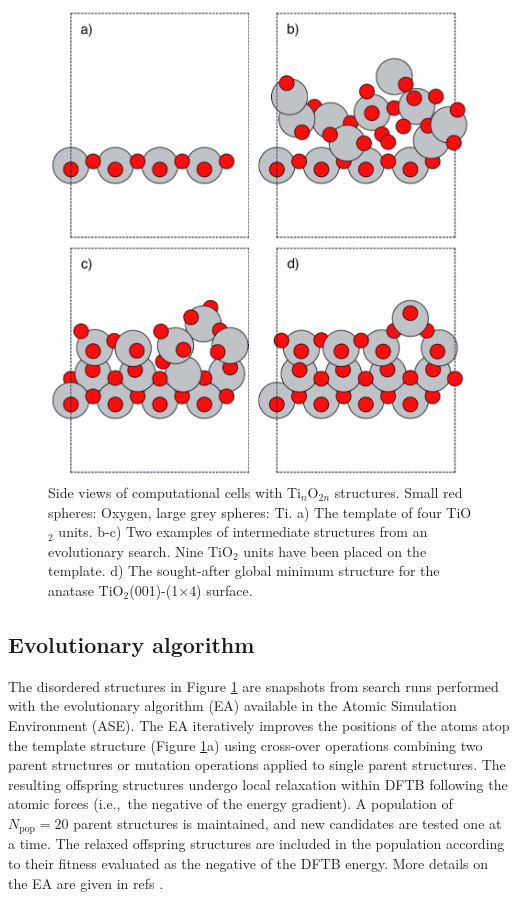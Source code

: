 \documentclass[aip,amsmath,amssymb,reprint]{revtex4-1}
\begin{document}
\begin{figure}[tb]
    \centering
    \includegraphics[width=1.0\columnwidth]{fig1-intro.pdf}
    \caption{Side views of computational cells with Ti$_{n}$O$_{2n}$ structures.
      Small red spheres: Oxygen, large grey spheres: Ti.
      a) The template of four TiO$_2$ units.
      b-c) Two examples of intermediate structures from an evolutionary search. Nine TiO$_2$ units
      have been placed on the template.
      d) The sought-after global minimum structure for the anatase TiO$_2$(001)-(1$\times$4) surface.
    }
    \label{figintro}
\end{figure}

\subsection{Evolutionary algorithm}
The disordered structures in Figure \ref{figintro} are snapshots from
search runs performed with the evolutionary algorithm (EA) available
in the Atomic Simulation Environment (ASE)\cite{ase2}.  The EA
iteratively improves the positions of the atoms atop the template
structure (Figure \ref{figintro}a) using cross-over operations
combining two parent structures or mutation operations applied to
single parent structures. The resulting offspring structures undergo
local relaxation within DFTB following the atomic forces (i.e.,\ the negative of
the energy gradient). A population of $N_\mathrm{pop}=20$ parent structures
is maintained, and new candidates are tested one at a time.
The relaxed offspring structures are included in the population
according to their fitness evaluated as the negative of the DFTB energy.
More details on the EA are given in refs \cite{Vilhelmsen2012, Vilhelmsen2014}.
\end{document}
